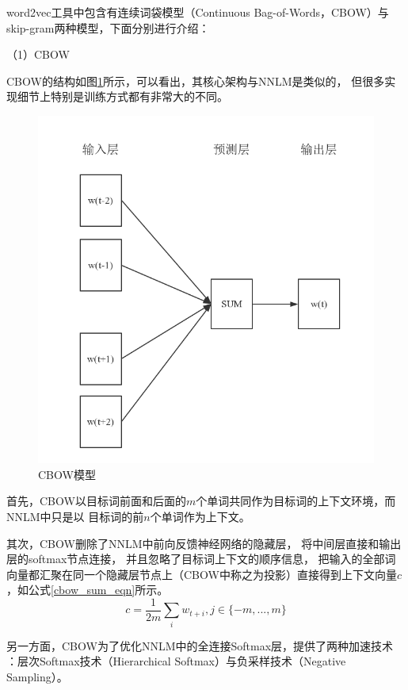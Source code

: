 \documentclass{standalone}
\begin{document}
word2vec工具中包含有连续词袋模型（Continuous Bag-of-Words，CBOW）与
skip-gram两种模型，下面分别进行介绍：

（1）CBOW

CBOW的结构如图\ref{cbow}所示，可以看出，其核心架构与NNLM是类似的，
但很多实现细节上特别是训练方式都有非常大的不同。
\begin{figure}[h]
    \includegraphics[scale=0.6]{picture/cbow.png}
    \caption{CBOW模型}
    \label{cbow}
\end{figure}

首先，CBOW以目标词前面和后面的$m$个单词共同作为目标词的上下文环境，而NNLM中只是以
目标词的前$n$个单词作为上下文。

其次，CBOW删除了NNLM中前向反馈神经网络的隐藏层，
将中间层直接和输出层的softmax节点连接，
并且忽略了目标词上下文的顺序信息，
把输入的全部词向量都汇聚在同一个隐藏层节点上（CBOW中称之为投影）直接得到上下文向量$c$
，如公式\ref{cbow_sum_eqn}所示。
\begin{equation}
    c = \frac{1}{2m}\sum_i w_{t+i}, j\in \{-m,...,m\}
    \label{cbow_sum_eqn}
\end{equation}

另一方面，CBOW为了优化NNLM中的全连接Softmax层，提供了两种加速技术
：层次Softmax技术（Hierarchical Softmax）与负采样技术（Negative Sampling）。
\end{document}
